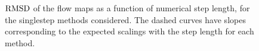 \begin{figure}[htpb]
    \centering
    
    \caption[$\rmsd$ of the flow maps as a function of numerical step length,
    for the singlestep methods considered]{$\rmsd$ of the flow maps as a
    function of numerical step length, for the singlestep methods considered.
    The dashed curves have slopes corresponding to the expected scalings with
    the step length for each method.}
    \label{fig:flowmap_err_fixed}
\end{figure}
